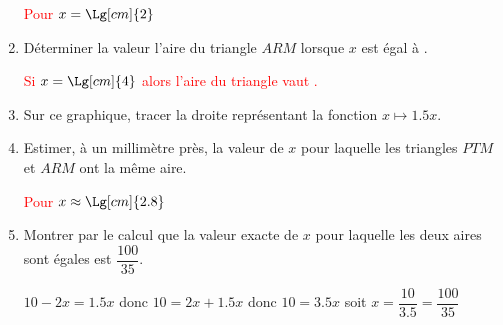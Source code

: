\begin{corrige}
\begin{enumerate}
        \textcolor{red}{Pour $x=\Lg[cm]{2}$}
        \item Déterminer la valeur l’aire du triangle $ARM$ lorsque $x$ est égal à .
        
        \textcolor{red}{Si $x=\Lg[cm]{4}$ alors l'aire du triangle vaut .}
        \item Sur ce graphique, tracer la droite représentant la fonction $x\longmapsto \num{1,5}x$.
        \item Estimer, à un millimètre près, la valeur de $x$ pour laquelle les triangles $PTM$ et $ARM$ ont la même aire.
        
        \textcolor{red}{Pour $x\approx\Lg[cm]{2.8}$}
        \item Montrer par le calcul que la valeur exacte de $x$ pour laquelle les deux aires sont égales est $\dfrac{100}{35}$.
        
        {\color{red} $10-2x=\num{1.5} x$ donc $10=2x +\num{1.5} x$ donc $10=\num{3.5} x$ soit $x=\dfrac{10}{\num{3.5}}=\dfrac{100}{35}$}
    \end{enumerate}
\end{corrige}
